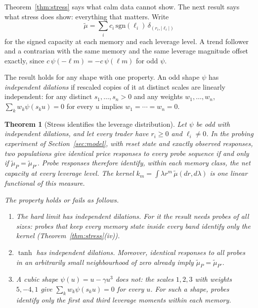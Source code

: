 \documentclass[12pt]{article}
\newtheorem{theorem}{Theorem}[section]
\theoremstyle{definition}
\theoremstyle{remark}
\begin{document}
Theorem~\ref{thm:stress} says what calm data cannot show. The next result says what stress does show: everything that matters. Write
\[
 \tilde\mu=\sum_ic_i\,\mathrm{sgn}(\ell_i)\,\delta_{(r_i,|\ell_i|)}
\]
for the signed capacity at each memory and each leverage level. A trend follower and a contrarian with the same memory and the same leverage magnitude offset exactly, since $c\,\psi(-\ell m)=-c\,\psi(\ell m)$ for odd $\psi$.

The result holds for any shape with one property. An odd shape $\psi$ has \emph{independent dilations} if rescaled copies of it at distinct scales are linearly independent: for any distinct $s_1,\ldots,s_n>0$ and any weights $w_1,\ldots,w_n$, $\sum_kw_k\psi(s_ku)=0$ for every $u$ implies $w_1=\cdots=w_n=0$.

\begin{theorem}[Stress identifies the leverage distribution]\label{thm:satident}
Let $\psi$ be odd with independent dilations, and let every trader have $r_i\ge0$ and $\ell_i\ne0$. In the probing experiment of Section~\ref{sec:model}, with reset state and exactly observed responses, two populations give identical price responses to every probe sequence if and only if $\tilde\mu_P=\tilde\mu_{P'}$. Probe responses therefore identify, within each memory class, the net capacity at every leverage level. The kernel $k_m=\int\lambda r^m\,\tilde\mu(dr,d\lambda)$ is one linear functional of this measure.

The property holds or fails as follows.
\begin{enumerate}[label=(\roman*),itemsep=1pt]
\item The hard limit has independent dilations. For it the result needs probes of all sizes: probes that keep every memory state inside every band identify only the kernel (Theorem~\ref{thm:stress}(iv)).
\item $\tanh$ has independent dilations. Moreover, identical responses to all probes in an arbitrarily small neighbourhood of zero already imply $\tilde\mu_P=\tilde\mu_{P'}$.
\item A cubic shape $\psi(u)=u-\gamma u^3$ does not: the scales $1,2,3$ with weights $5,-4,1$ give $\sum_kw_k\psi(s_ku)=0$ for every $u$. For such a shape, probes identify only the first and third leverage moments within each memory.
\end{enumerate}
\end{theorem}
\end{document}
